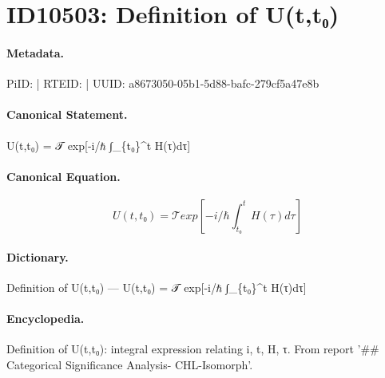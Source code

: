\section*{ID10503: Definition of U(t,t₀)}
\paragraph{Metadata.}
PiID:  | RTEID:  | UUID: a8673050-05b1-5d88-bafc-279cf5a47e8b

\paragraph{Canonical Statement.}
U(t,t₀) = 𝒯 exp[-i/ℏ ∫\_\{t₀\}\textasciicircum{}t H(τ)dτ]

\paragraph{Canonical Equation.}
\[
U(t,t₀) = 𝒯 exp[-i/ℏ ∫_{t₀}^t H(τ)dτ]
\]

\paragraph{Dictionary.}
Definition of U(t,t₀) — U(t,t₀) = 𝒯 exp[-i/ℏ ∫\_\{t₀\}\textasciicircum{}t H(τ)dτ]

\paragraph{Encyclopedia.}
Definition of U(t,t₀): integral expression relating i, t, H, τ. From report '\#\# Categorical Significance Analysis- CHL-Isomorph'.
